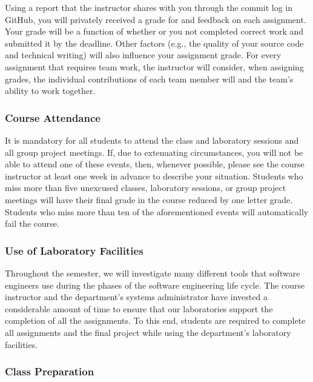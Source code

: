 \documentclass[11pt]{article}
\begin{document}
Using a report that the instructor shares with you through the commit log in GitHub, you will privately received a grade
for and feedback on each assignment. Your grade will be a function of whether or you not completed correct work and
submitted it by the deadline. Other factors (e.g., the quality of your source code and technical writing) will also
influence your assignment grade. For every assignment that requires team work, the instructor will consider, when
assigning grades, the individual contributions of each team member will and the team's ability to work together.

\subsubsection*{Course Attendance}

It is mandatory for all students to attend the class and laboratory sessions and all group project meetings. If, due to
extenuating circumstances, you will not be able to attend one of these events, then, whenever possible, please see the
course instructor at least one week in advance to describe your situation. Students who miss more than five unexcused
classes, laboratory sessions, or group project meetings will have their final grade in the course reduced by one letter
grade. Students who miss more than ten of the aforementioned events will automatically fail the course.

\subsubsection*{Use of Laboratory Facilities}

Throughout the semester, we will investigate many different tools that software engineers use during the phases of the
software engineering life cycle. The course instructor and the department's systems administrator have invested a
considerable amount of time to ensure that our laboratories support the completion of all the assignments. To this end,
students are required to complete all assignments and the final project while using the department's laboratory
facilities.

\subsubsection*{Class Preparation}
\end{document}
